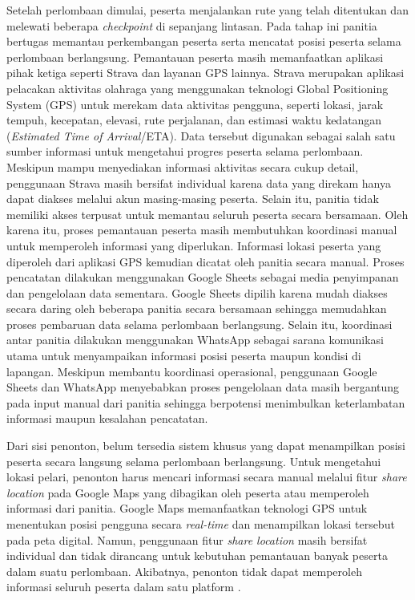 Setelah perlombaan dimulai, peserta menjalankan rute yang telah ditentukan dan melewati beberapa \textit{checkpoint} di sepanjang lintasan. Pada tahap ini panitia bertugas memantau perkembangan peserta serta mencatat posisi peserta selama perlombaan berlangsung. Pemantauan peserta masih memanfaatkan aplikasi pihak ketiga seperti Strava dan layanan GPS lainnya. Strava merupakan aplikasi pelacakan aktivitas olahraga yang menggunakan teknologi Global Positioning System (GPS) untuk merekam data aktivitas pengguna, seperti lokasi, jarak tempuh, kecepatan, elevasi, rute perjalanan, dan estimasi waktu kedatangan (\textit{Estimated Time of Arrival}/ETA). Data tersebut digunakan sebagai salah satu sumber informasi untuk mengetahui progres peserta selama perlombaan. Meskipun mampu menyediakan informasi aktivitas secara cukup detail, penggunaan Strava masih bersifat individual karena data yang direkam hanya dapat diakses melalui akun masing-masing peserta. Selain itu, panitia tidak memiliki akses terpusat untuk memantau seluruh peserta secara bersamaan. Oleh karena itu, proses pemantauan peserta masih membutuhkan koordinasi manual untuk memperoleh informasi yang diperlukan. Informasi lokasi peserta yang diperoleh dari aplikasi GPS kemudian dicatat oleh panitia secara manual. Proses pencatatan dilakukan menggunakan Google Sheets sebagai media penyimpanan dan pengelolaan data sementara. Google Sheets dipilih karena mudah diakses secara daring oleh beberapa panitia secara bersamaan sehingga memudahkan proses pembaruan data selama perlombaan berlangsung. Selain itu, koordinasi antar panitia dilakukan menggunakan WhatsApp sebagai sarana komunikasi utama untuk menyampaikan informasi posisi peserta maupun kondisi di lapangan. Meskipun membantu koordinasi operasional, penggunaan Google Sheets dan WhatsApp menyebabkan proses pengelolaan data masih bergantung pada input manual dari panitia sehingga berpotensi menimbulkan keterlambatan informasi maupun kesalahan pencatatan.

Dari sisi penonton, belum tersedia sistem khusus yang dapat menampilkan posisi peserta secara langsung selama perlombaan berlangsung. Untuk mengetahui lokasi pelari, penonton harus mencari informasi secara manual melalui fitur \textit{share location} pada Google Maps yang dibagikan oleh peserta atau memperoleh informasi dari panitia. Google Maps memanfaatkan teknologi GPS untuk menentukan posisi pengguna secara \textit{real-time} dan menampilkan lokasi tersebut pada peta digital. Namun, penggunaan fitur \textit{share location} masih bersifat individual dan tidak dirancang untuk kebutuhan pemantauan banyak peserta dalam suatu perlombaan. Akibatnya, penonton tidak dapat memperoleh informasi seluruh peserta dalam satu platform .

